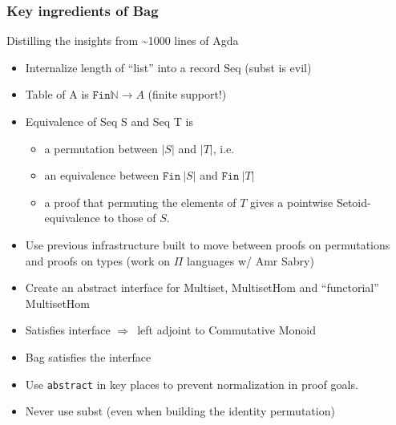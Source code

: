 \documentclass[serif,mathserif,professionalfont,10pt]{beamer}
\begin{document}
\begin{frame}
\frametitle{Key ingredients of Bag}
Distilling the insights from \textasciitilde1000 lines of Agda 
\begin{itemize}
\item Internalize length of ``list'' into a record Seq (subst is evil)
\item Table of A is $\texttt{Fin} \mathbb{N} \rightarrow A$ (finite
  support!)
\item Equivalence of Seq S and Seq T is
\begin{itemize}
\item a permutation between $|S|$ and $|T|$, i.e.
\item an equivalence between $\texttt{Fin}~ |S|$ and $\texttt{Fin}~ |T|$
\item a proof that permuting the elements of $T$ gives a
pointwise Setoid-equivalence to those of $S$.
\end{itemize}
\item Use previous infrastructure built to move between proofs
on permutations and proofs on types (work on $\Pi$ languages
w/ Amr Sabry)
\item Create an abstract interface for Multiset, MultisetHom and 
``functorial'' MultisetHom
\item Satisfies interface $\Rightarrow$\ left
adjoint to Commutative Monoid
\item Bag satisfies the interface
\item Use \texttt{abstract} in key places to prevent normalization
in proof goals.
\item Never use subst (even when building the identity permutation)
\end{itemize}
\end{frame}
\end{document}
